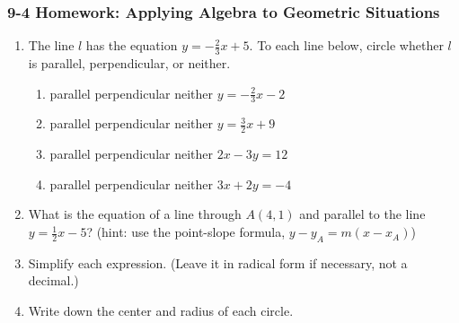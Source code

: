 \documentclass[12pt, twoside]{article}
\begin{document}
\subsubsection*{9-4 Homework: Applying Algebra to Geometric Situations}
  \begin{enumerate}

  \item The line $l$ has the equation $y=-\frac{2}{3}x+5$. To each line below, circle whether $l$ is parallel, perpendicular, or neither.
    \begin{enumerate}
      \item parallel \quad perpendicular \quad neither \qquad $y=-\frac{2}{3}x-2$
      \vspace{0.5cm}
      \item parallel \quad perpendicular \quad neither \qquad $y=\frac{3}{2}x+9$
      \vspace{0.5cm}
      \item parallel \quad perpendicular \quad neither \qquad $2x-3y=12$
      \vspace{2cm}
      \item parallel \quad perpendicular \quad neither \qquad $3x+2y=-4$
      \vspace{2.5cm}
    \end{enumerate}

    \item What is the equation of a line through $A(4,1)$ and parallel to the line $y=\frac{1}{2}x-5$? (hint: use the point-slope formula, $y-y_A=m (x-x_A)$) \vspace{2cm}

  \item Simplify each expression. (Leave it in radical form if necessary, not a decimal.)
    \begin{enumerate}
    \end{enumerate}
    \vspace{2cm}


  \item Write down the center and radius of each circle.
    \begin{enumerate}
    \end{enumerate}  \vspace{2cm}


\end{enumerate}
\end{document}
